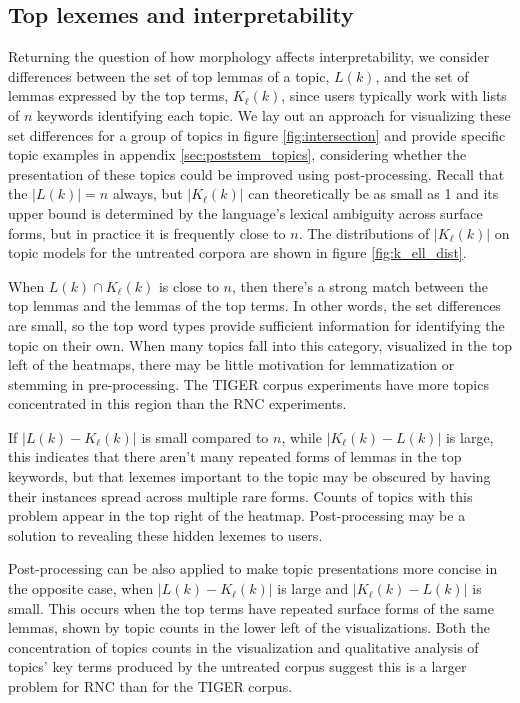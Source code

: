 \documentclass[11pt,a4paper]{article}
\begin{document}
\subsection{Top lexemes and interpretability}
Returning the question of how morphology affects interpretability, we consider differences between the set of top lemmas of a topic, $L(k)$, and the set of lemmas expressed by the top terms, $K_\ell(k)$, since users typically work with lists of $n$ keywords identifying each topic.
We lay out an approach for visualizing these set differences for a group of topics in figure \ref{fig:intersection} and provide specific topic examples in appendix \ref{sec:poststem_topics}, considering whether the presentation of these topics could be improved using post-processing. Recall that the $|L(k)|=n$ always, but $|K_\ell(k)|$ can theoretically be as small as 1 and its upper bound is determined by the language's lexical ambiguity across surface forms, but in practice it is frequently close to $n$. The distributions of $|K_\ell(k)|$ on topic models for the untreated corpora are shown in figure \ref{fig:k_ell_dist}.

When $L(k) \cap K_\ell(k)$ is close to $n$, then there's a strong match between the top lemmas and the lemmas of the top terms. In other words, the set differences are small, so the top word types provide sufficient information for identifying the topic on their own. When many topics fall into this category, visualized in the top left of the heatmaps, there may be little motivation for lemmatization or stemming in pre-processing. The TIGER corpus experiments have more topics concentrated in this region than the RNC experiments.

If $|L(k)-K_\ell(k)|$ is small compared to $n$, while $|K_\ell(k) - L(k)|$ is large, this indicates that there aren't many repeated forms of lemmas in the top keywords, but that lexemes important to the topic may be obscured by having their instances spread across multiple rare forms. Counts of topics with this problem appear in the top right of the heatmap. Post-processing may be a solution to revealing these hidden lexemes to users.

Post-processing can be also applied to make topic presentations more concise in the opposite case, when $|L(k)-K_\ell(k)|$ is large and $|K_\ell(k) - L(k)|$ is small. This occurs when the top terms have repeated surface forms of the same lemmas, shown by topic counts in the lower left of the visualizations. Both the concentration of topics counts in the visualization and qualitative analysis of topics' key terms produced by the untreated corpus suggest this is a larger problem for RNC than for the TIGER corpus.
\end{document}

